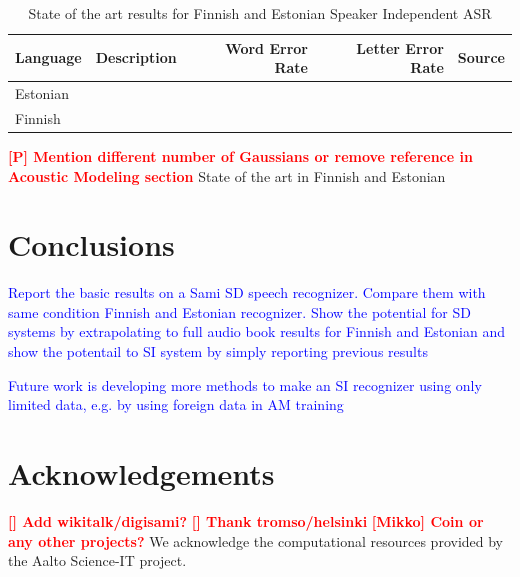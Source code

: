 \documentclass[b5paper]{article}
\newcommand{\todo}[2]{{\textcolor{red}{\bf [#1] #2 }}}
\newcommand{\note}[1]{{\textcolor{blue}{#1}}}
\begin{document}
\begin{table}[!h]
\centering
\begin{tabular}{llrrl}
\textbf{Language} & \textbf{Description} & \textbf{Word Error Rate} & \textbf{Letter Error Rate} & \textbf{Source}\\\hline
Estonian &  & & &  \\
Finnish &  & & &  \\
\end{tabular}
\caption{State of the art results for Finnish and Estonian Speaker Independent ASR}
\end{table}


\todo{P}{Mention different number of Gaussians or remove reference in Acoustic Modeling section}
State of the art in Finnish \cite{hirsimaki2006unlimited} and Estonian \cite{kurimo2015modeling}


\section{Conclusions} 
\note{Report the basic results on a Sami SD speech recognizer. Compare them with same condition Finnish and Estonian recognizer. Show the potential for SD systems by extrapolating to full audio book results for Finnish and Estonian and show the potentail to SI system by simply reporting previous results}

\note{Future work is developing more methods to make an SI recognizer using only limited data, e.g. by using foreign data in AM training}

\section{Acknowledgements} 
\todo{}{Add wikitalk/digisami?} \todo{}{Thank tromso/helsinki} \todo{Mikko}{Coin or any other projects?}
We acknowledge the computational resources provided by the Aalto Science-IT project.




 
\end{document}
